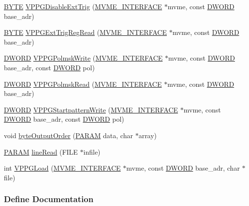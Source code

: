 \begin{DoxyCompactItemize}
\item 
\hyperlink{vt2_8h_a4ae1dab0fb4b072a66584546209e7d58}{BYTE} \hyperlink{vppg_8c_a137e2408b777c360d4adc12f37ed90e6}{VPPGDisableExtTrig} (\hyperlink{structMVME__INTERFACE}{MVME\_\-INTERFACE} $\ast$mvme, const \hyperlink{vt2_8h_a798af1e30bc65f319c1a246cecf59e39}{DWORD} base\_\-adr)
\item 
\hyperlink{vt2_8h_a4ae1dab0fb4b072a66584546209e7d58}{BYTE} \hyperlink{vppg_8c_a39c304959840cd2c1a0812a4c6ac0ee6}{VPPGExtTrigRegRead} (\hyperlink{structMVME__INTERFACE}{MVME\_\-INTERFACE} $\ast$mvme, const \hyperlink{vt2_8h_a798af1e30bc65f319c1a246cecf59e39}{DWORD} base\_\-adr)
\item 
\hyperlink{vt2_8h_a798af1e30bc65f319c1a246cecf59e39}{DWORD} \hyperlink{vppg_8c_a10ec4e8a15c99cffbb75a1bba6d72c1d}{VPPGPolmskWrite} (\hyperlink{structMVME__INTERFACE}{MVME\_\-INTERFACE} $\ast$mvme, const \hyperlink{vt2_8h_a798af1e30bc65f319c1a246cecf59e39}{DWORD} base\_\-adr, const \hyperlink{vt2_8h_a798af1e30bc65f319c1a246cecf59e39}{DWORD} pol)
\item 
\hyperlink{vt2_8h_a798af1e30bc65f319c1a246cecf59e39}{DWORD} \hyperlink{vppg_8c_afc374ec00602443b45c71d28043d7631}{VPPGPolmskRead} (\hyperlink{structMVME__INTERFACE}{MVME\_\-INTERFACE} $\ast$mvme, const \hyperlink{vt2_8h_a798af1e30bc65f319c1a246cecf59e39}{DWORD} base\_\-adr)
\item 
\hyperlink{vt2_8h_a798af1e30bc65f319c1a246cecf59e39}{DWORD} \hyperlink{vppg_8c_a767e059079431674f2649671ec2b72c1}{VPPGStartpatternWrite} (\hyperlink{structMVME__INTERFACE}{MVME\_\-INTERFACE} $\ast$mvme, const \hyperlink{vt2_8h_a798af1e30bc65f319c1a246cecf59e39}{DWORD} base\_\-adr, const \hyperlink{vt2_8h_a798af1e30bc65f319c1a246cecf59e39}{DWORD} pol)
\item 
void \hyperlink{vppg_8c_a75ca53aa4c6983bef5186a0138854857}{byteOutputOrder} (\hyperlink{structparameters}{PARAM} data, char $\ast$array)
\item 
\hyperlink{structparameters}{PARAM} \hyperlink{vppg_8c_af4b7a92a95e005bb1ec7e30fc56724c3}{lineRead} (FILE $\ast$infile)
\item 
int \hyperlink{vppg_8c_acd643aa3649bb10efabfdc28963ac52b}{VPPGLoad} (\hyperlink{structMVME__INTERFACE}{MVME\_\-INTERFACE} $\ast$mvme, const \hyperlink{vt2_8h_a798af1e30bc65f319c1a246cecf59e39}{DWORD} base\_\-adr, char $\ast$file)
\end{DoxyCompactItemize}


\subsubsection{Define Documentation}
